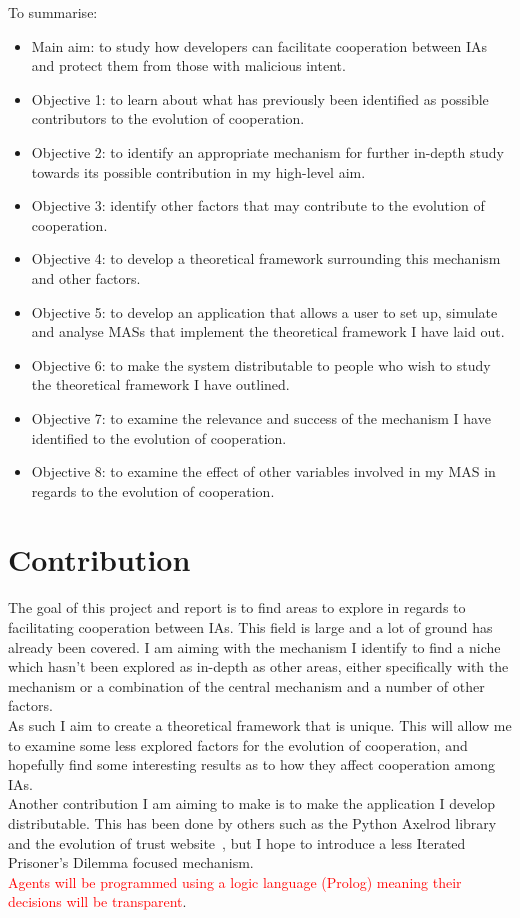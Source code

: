 \documentclass[]{final_report}
\begin{document}
To summarise:
\begin{itemize}
	\item Main aim: to study how developers can facilitate cooperation between IAs and protect them from those with malicious intent.
	\item Objective 1: to learn about what has previously been identified as possible contributors to the evolution of cooperation.
	\item Objective 2: to identify an appropriate mechanism for further in-depth study towards its possible contribution in my high-level aim.
	\item Objective 3: identify other factors that may contribute to the evolution of cooperation.
	\item Objective 4: to develop a theoretical framework surrounding this mechanism and other factors.
	\item Objective 5: to develop an application that allows a user to set up, simulate and analyse MASs that implement the theoretical framework I have laid out.
	\item Objective 6: to make the system distributable to people who wish to study the theoretical framework I have outlined.
	\item Objective 7: to examine the relevance and success of the mechanism I have identified to the evolution of cooperation.
	\item Objective 8: to examine the effect of other variables involved in my MAS in regards to the evolution of cooperation.
\end{itemize}

\section{Contribution}
The goal of this project and report is to find areas to explore in regards to facilitating cooperation between IAs. This field is large and a lot of ground has already been covered. I am aiming with the mechanism I identify to find a niche which hasn't been explored as in-depth as other areas, either specifically with the mechanism or a combination of the central mechanism and a number of other factors.\\
As such I aim to create a theoretical framework that is unique. This will allow me to examine some less explored factors for the evolution of cooperation, and hopefully find some interesting results as to how they affect cooperation among IAs.\\
Another contribution I am aiming to make is to make the application I develop distributable. This has been done by others such as the Python Axelrod library~\cite{axelrodproject} and the evolution of trust website~\cite{evol_trust}, but I hope to introduce a less Iterated Prisoner's Dilemma focused mechanism.\\
\textcolor{red}{Agents will be programmed using a logic language (Prolog) meaning their decisions will be transparent}.
\end{document}

